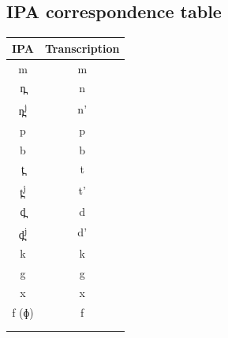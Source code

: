 \documentclass[a4paper, 12pt]{article}
\begin{document}
			\subsection*{IPA correspondence table \vspace*{-1em}}
			
\begin{minipage}[t]{.3\linewidth}
\begin{table}[H]
\begin{tabular}{cc}
\toprule
IPA        & Transcription \\
\bottomrule
m          & m                       \\
n̪         & n                       \\
n̪\textsuperscript{j}        & n'                      \\
p          & p                       \\
b          & b                       \\
t̪         & t                       \\
t̪\textsuperscript{j}        & t'                      \\
d̪         & d                       \\
d̪\textsuperscript{j}        & d'                      \\
k          & k                       \\
g          & g                       \\
x          & x                       \\
f (ɸ)      & f                       \\
     &                  \\
     \addlinespace[0.065cm]
\bottomrule
\end{tabular}
\end{table}
\end{minipage}
\hfill
\end{document}
